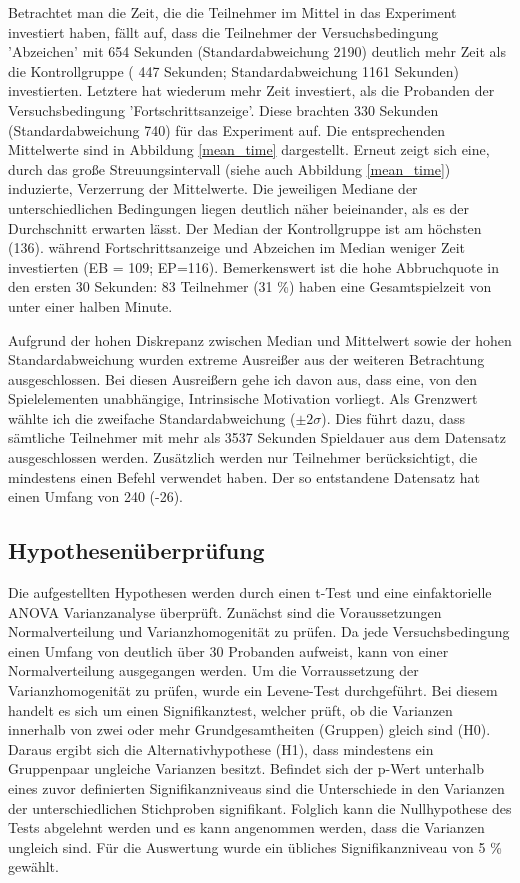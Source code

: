 Betrachtet man die Zeit, die die Teilnehmer im Mittel in das Experiment investiert haben, fällt auf, dass die Teilnehmer der Versuchsbedingung 'Abzeichen' mit 654 Sekunden (Standardabweichung 2190) deutlich mehr Zeit als die Kontrollgruppe ( 447 Sekunden; Standardabweichung 1161 Sekunden) investierten. Letztere hat wiederum mehr Zeit investiert, als die Probanden der Versuchsbedingung 'Fortschrittsanzeige'. Diese brachten 330 Sekunden (Standardabweichung 740) für das Experiment auf. Die entsprechenden Mittelwerte sind in Abbildung \ref{mean_time} dargestellt. Erneut zeigt sich eine, durch das große Streuungsintervall (siehe auch Abbildung \ref{mean_time}) induzierte, Verzerrung der Mittelwerte. Die jeweiligen Mediane der unterschiedlichen Bedingungen liegen deutlich näher beieinander, als es der Durchschnitt erwarten lässt. Der Median der Kontrollgruppe ist am höchsten (136). während Fortschrittsanzeige und Abzeichen im Median weniger Zeit investierten (EB = 109; EP=116). Bemerkenswert ist die hohe Abbruchquote in den ersten 30 Sekunden: 83 Teilnehmer (31 \%) haben eine Gesamtspielzeit von unter einer halben Minute.

Aufgrund der hohen Diskrepanz zwischen Median und Mittelwert sowie der hohen Standardabweichung wurden extreme Ausreißer aus der weiteren Betrachtung ausgeschlossen. Bei diesen Ausreißern gehe ich davon aus, dass eine, von den Spielelementen unabhängige, Intrinsische Motivation vorliegt. Als Grenzwert wählte ich die zweifache Standardabweichung ($\pm 2\sigma$). Dies führt dazu, dass sämtliche Teilnehmer mit mehr als 3537 Sekunden Spieldauer aus dem Datensatz ausgeschlossen werden. Zusätzlich werden nur Teilnehmer berücksichtigt, die mindestens einen Befehl verwendet haben. Der so entstandene Datensatz hat einen Umfang von 240 (-26).

\subsection{Hypothesenüberprüfung}\label{hypo}
Die aufgestellten Hypothesen werden durch einen t-Test und eine einfaktorielle  ANOVA  Varianzanalyse überprüft. Zunächst sind die Voraussetzungen Normalverteilung und Varianzhomogenität zu prüfen. Da jede Versuchsbedingung einen Umfang von deutlich über 30 Probanden aufweist, kann von einer Normalverteilung ausgegangen werden. Um die Vorraussetzung der Varianzhomogenität zu prüfen, wurde ein Levene-Test durchgeführt. Bei diesem handelt es sich um einen Signifikanztest, welcher prüft, ob die Varianzen innerhalb von zwei oder mehr Grundgesamtheiten (Gruppen) gleich sind (H0). Daraus ergibt sich die Alternativhypothese (H1), dass mindestens ein Gruppenpaar ungleiche Varianzen besitzt. Befindet sich der p-Wert unterhalb  eines zuvor definierten Signifikanzniveaus sind die Unterschiede in den Varianzen der unterschiedlichen Stichproben signifikant. Folglich kann die Nullhypothese des Tests abgelehnt werden und es kann angenommen werden, dass die Varianzen ungleich sind. Für die Auswertung wurde ein übliches Signifikanzniveau von 5 \% gewählt.


